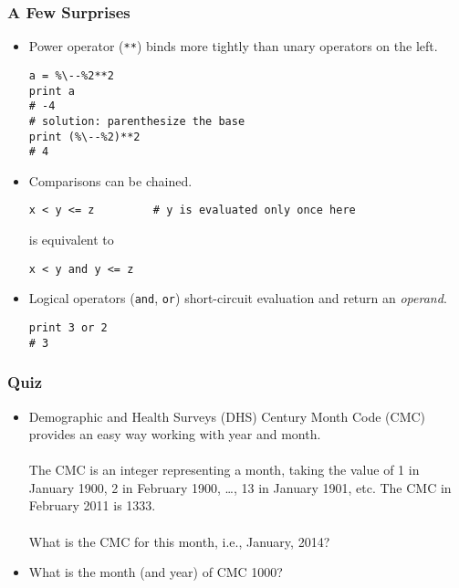 \documentclass{beamer}
\begin{document}
\begin{frame}[fragile]
\frametitle{A Few Surprises}
\begin{itemize}
\item Power operator (\lstinline{**}) binds more tightly
      than unary operators on the left.
\begin{lstlisting}[escapechar=\%]
a = %\--%2**2
print a
# -4
# solution: parenthesize the base
print (%\--%2)**2
# 4 
\end{lstlisting}
\item Comparisons can be chained. 
\begin{lstlisting}
x < y <= z         # y is evaluated only once here
\end{lstlisting}
is equivalent to
\begin{lstlisting}
x < y and y <= z
\end{lstlisting}
\item Logical operators (\lstinline{and}, \lstinline{or})
      short-circuit evaluation and return 
      an \emph{operand}.
\begin{lstlisting}
print 3 or 2
# 3
\end{lstlisting}
\end{itemize}
\end{frame}

\begin{frame}[fragile]
\frametitle{Quiz}
\begin{itemize}
\item Demographic and Health Surveys (DHS) Century
Month Code (CMC)\cite[p.5]{MEASUREDHSPlus} provides an easy way
working with year and month.
\\~\\
The CMC is
an integer representing a month, taking
the value of 1 in January 1900, 2 in
February 1900, \ldots, 13 in January 1901, etc.
The CMC in February 2011 is 1333.
\\~\\
What is the CMC for this month, i.e., January, 2014?
\item<3-> What is the month (and year) of CMC 1000? 
\end{itemize}
\end{frame}
\end{document}
